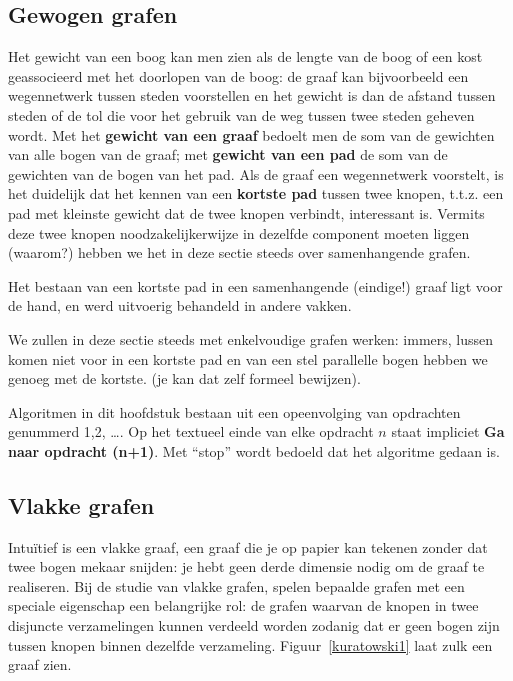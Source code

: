 \subsection{Gewogen grafen}



Het gewicht van een boog kan men zien als de lengte van de boog of een
kost geassocieerd met het doorlopen van de boog: de graaf kan
bijvoorbeeld een wegennetwerk tussen steden voorstellen en het gewicht
is dan de afstand tussen steden of de tol die voor het gebruik van de
weg tussen twee steden geheven wordt. Met het \textbf{gewicht van een
graaf} bedoelt men de som van de gewichten van alle bogen van de
graaf; met \textbf{gewicht van een pad} de som van de gewichten van de
bogen van het pad. Als de graaf een wegennetwerk voorstelt, is het
duidelijk dat het kennen van een \textbf{kortste pad} tussen twee
knopen, t.t.z. een pad met kleinste gewicht dat de twee knopen
verbindt, interessant is. Vermits deze twee knopen noodzakelijkerwijze
in dezelfde component moeten liggen (waarom?) hebben we het in deze
sectie steeds over samenhangende grafen.

Het bestaan van een kortste pad in een samenhangende (eindige!)  graaf
ligt voor de hand, en werd uitvoerig behandeld in andere vakken.

We zullen in deze sectie steeds met enkelvoudige grafen werken:
immers, lussen komen niet voor in een kortste pad en van een stel
parallelle bogen hebben we genoeg met de kortste. (je kan dat zelf
formeel bewijzen).

Algoritmen in dit hoofdstuk bestaan uit een opeenvolging van
opdrachten genummerd 1,2, \ldots . Op het textueel einde van elke
opdracht $n$ staat impliciet 
{\bf Ga naar opdracht (n+1)}.
Met ``stop'' wordt bedoeld dat het algoritme gedaan is.


\subsection{Vlakke grafen}

Intu\"{i}tief is een vlakke graaf, een graaf die je op papier kan
tekenen zonder dat twee bogen mekaar snijden: je hebt geen derde
dimensie nodig om de graaf te realiseren. Bij de studie van vlakke
grafen, spelen bepaalde grafen met een speciale eigenschap een belangrijke rol:
de grafen waarvan de knopen in twee disjuncte verzamelingen kunnen
verdeeld worden zodanig dat er geen bogen zijn tussen knopen binnen
dezelfde verzameling. Figuur~\ref{kuratowski1} laat zulk een graaf
zien.

